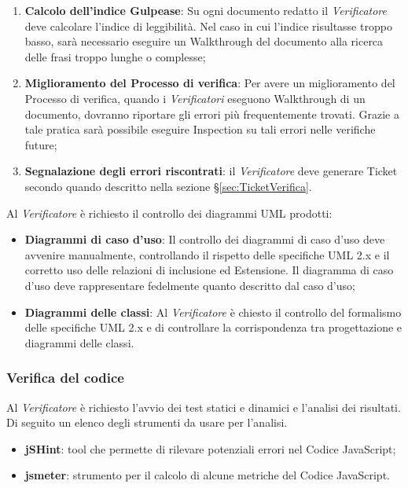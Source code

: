 {\begin{enumerate}
	\item \textbf{Calcolo dell’indice Gulpease}: Su ogni documento redatto il \emph{Verificatore} deve calcolare l’indice di leggibilità. Nel caso in cui l’indice risultasse troppo basso, sarà necessario eseguire un Walkthrough del documento alla ricerca delle frasi troppo lunghe o complesse;
	\item \textbf{Miglioramento del Processo di verifica}: Per avere un miglioramento del Processo di verifica, quando i \emph{Verificatori} eseguono Walkthrough di un documento, dovranno riportare gli errori più frequentemente trovati. Grazie a tale pratica sarà possibile eseguire Inspection su tali errori nelle verifiche future;
	\item \textbf{Segnalazione degli errori riscontrati}: il \emph{Verificatore} deve generare Ticket secondo quando descritto nella
	sezione \S\ref{sec:TicketVerifica}.
	\end{enumerate}
	\label{sec:strumentiVerifica}
Al \emph{Verificatore} è richiesto il controllo dei diagrammi UML prodotti:
\begin{itemize}

\item \textbf{Diagrammi di caso d’uso}: Il controllo dei diagrammi di caso d’uso deve avvenire manualmente, controllando il rispetto delle specifiche UML 2.x e il corretto uso delle relazioni di inclusione ed Estensione. Il diagramma di caso d’uso deve rappresentare fedelmente quanto descritto dal caso d’uso;
\item \textbf{Diagrammi delle classi}: Al \emph{Verificatore} è chiesto il controllo del formalismo delle specifiche UML 2.x e di controllare la corrispondenza tra progettazione e diagrammi delle classi.

\end{itemize}

	\subsubsection{Verifica del codice}
	Al \emph{Verificatore} è richiesto l’avvio dei test statici e dinamici e l’analisi dei risultati. Di seguito un elenco degli strumenti da usare per l’analisi.
	
	\label{sec:analisiStatica}
	  \begin{itemize}
	  \item \textbf{jSHint}: tool che permette di rilevare potenziali errori nel Codice JavaScript;
	  \item \textbf{jsmeter}: strumento per il calcolo di alcune metriche del Codice JavaScript.
	  \end{itemize}
	
}
